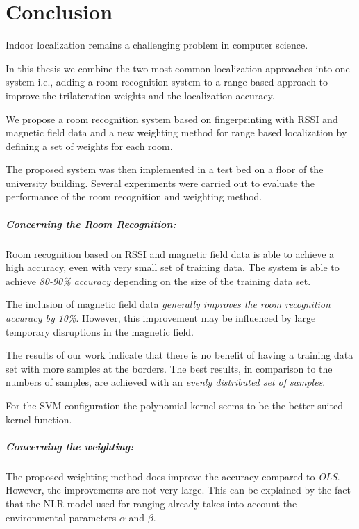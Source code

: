 \chapter{Conclusion}

\label{Chapter6}


Indoor localization remains a challenging problem in computer science.

In this thesis we combine the two most common localization approaches into one system i.e., adding a room recognition system to a range based approach to improve the trilateration weights and the localization accuracy.

We propose a room recognition system based on fingerprinting with RSSI and magnetic field data and a new weighting method for range based localization by defining a set of weights for each room.

The proposed system was then implemented in a test bed on a floor of the university building. Several experiments were carried out to evaluate the performance of the room recognition and weighting method.

\paragraph{Concerning the Room Recognition:}
Room recognition based on RSSI and magnetic field data is able to achieve a high accuracy, even with very small set of training data. The system is able to achieve \emph{80-90\% accuracy} depending on the size of the training data set.

The inclusion of magnetic field data \emph{generally improves the room recognition accuracy by 10\%}. However, this improvement may be influenced by large temporary disruptions in the magnetic field.

The results of our work indicate that there is no benefit of having a training data set with more samples at the borders. The best results, in comparison to the numbers of samples, are achieved with an \emph{evenly distributed set of samples}.

For the SVM configuration the polynomial kernel seems to be the better suited kernel function.


\paragraph{Concerning the weighting:}

The proposed weighting method does improve the accuracy compared to \emph{OLS}. However, the improvements are not very large. This can be explained by the fact that the NLR-model used for ranging already takes into account the environmental parameters $\alpha$ and $\beta$.

